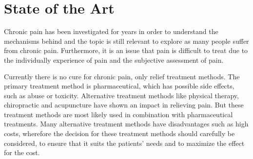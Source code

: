 \section{State of the Art} \label{sec:SOTA}




Chronic pain has been investigated for years in order to understand the mechanisms behind and the topic is still relevant to explore as many people suffer from chronic pain. Furthermore, it is an issue that pain is difficult to treat due to the individually experience of pain and the subjective assessment of pain. \cite{Briggs2010,Norton1999}

Currently there is no cure for chronic pain, only relief treatment methods. The primary treatment method is pharmaceutical, which has possible side effects, such as abuse or toxicity. Alternative treatment methods like physical therapy, chiropractic and acupuncture have shown an impact in relieving pain.  But these treatment methods are most likely used in combination with pharmaceutical treatments. Many alternative treatment methods have disadvantages such as high costs, wherefore the decision for these treatment methods should carefully be considered, to ensure that it suits the patients’ needs and to maximize the effect for the cost. \cite{marcus2009,pope2017}

